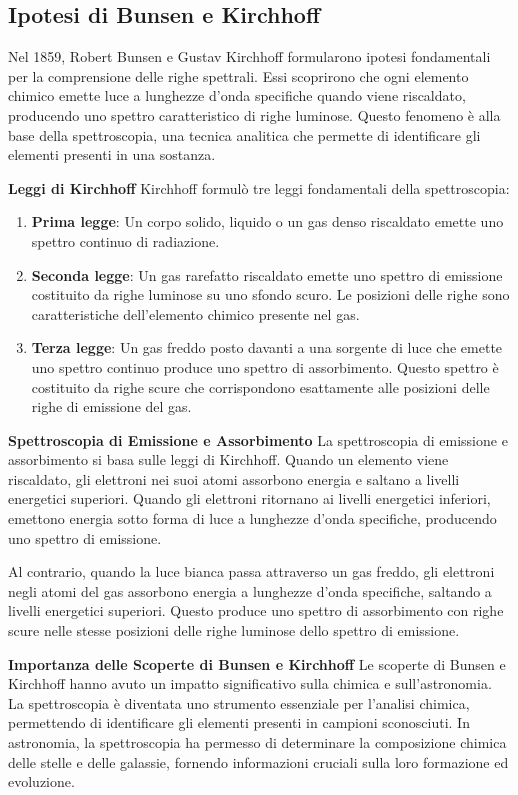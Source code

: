\subsection*{Ipotesi di Bunsen e Kirchhoff}
Nel 1859, Robert Bunsen e Gustav Kirchhoff formularono ipotesi fondamentali per la comprensione delle righe spettrali. Essi scoprirono che ogni elemento chimico emette luce a lunghezze d'onda specifiche quando viene riscaldato, producendo uno spettro caratteristico di righe luminose. Questo fenomeno è alla base della spettroscopia, una tecnica analitica che permette di identificare gli elementi presenti in una sostanza.

\textbf{Leggi di Kirchhoff}
Kirchhoff formulò tre leggi fondamentali della spettroscopia:
\begin{enumerate}
    \item \textbf{Prima legge}: Un corpo solido, liquido o un gas denso riscaldato emette uno spettro continuo di radiazione.
    \item \textbf{Seconda legge}: Un gas rarefatto riscaldato emette uno spettro di emissione costituito da righe luminose su uno sfondo scuro. Le posizioni delle righe sono caratteristiche dell'elemento chimico presente nel gas.
    \item \textbf{Terza legge}: Un gas freddo posto davanti a una sorgente di luce che emette uno spettro continuo produce uno spettro di assorbimento. Questo spettro è costituito da righe scure che corrispondono esattamente alle posizioni delle righe di emissione del gas.
\end{enumerate}

\textbf{Spettroscopia di Emissione e Assorbimento}
La spettroscopia di emissione e assorbimento si basa sulle leggi di Kirchhoff. Quando un elemento viene riscaldato, gli elettroni nei suoi atomi assorbono energia e saltano a livelli energetici superiori. Quando gli elettroni ritornano ai livelli energetici inferiori, emettono energia sotto forma di luce a lunghezze d'onda specifiche, producendo uno spettro di emissione.

Al contrario, quando la luce bianca passa attraverso un gas freddo, gli elettroni negli atomi del gas assorbono energia a lunghezze d'onda specifiche, saltando a livelli energetici superiori. Questo produce uno spettro di assorbimento con righe scure nelle stesse posizioni delle righe luminose dello spettro di emissione.

\textbf{Importanza delle Scoperte di Bunsen e Kirchhoff}
Le scoperte di Bunsen e Kirchhoff hanno avuto un impatto significativo sulla chimica e sull'astronomia. La spettroscopia è diventata uno strumento essenziale per l'analisi chimica, permettendo di identificare gli elementi presenti in campioni sconosciuti. In astronomia, la spettroscopia ha permesso di determinare la composizione chimica delle stelle e delle galassie, fornendo informazioni cruciali sulla loro formazione ed evoluzione.

